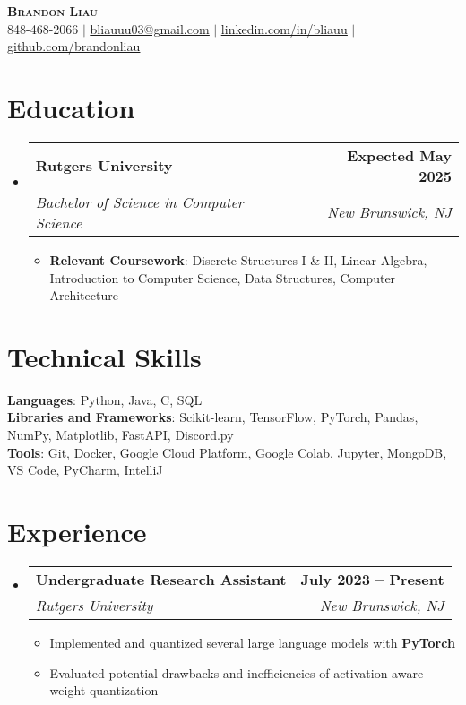 \documentclass[letterpaper,11pt]{article}
\makeatletter
\newcommand{\resumeItem}[1]{
  \item\small{
    {#1 \vspace{-2pt}}
  }
}
\newcommand{\resumeSubheading}[4]{
  \vspace{-2pt}\item
    \begin{tabular*}{0.97\textwidth}[t]{l@{\extracolsep{\fill}}r}
      \textbf{#1} & #2 \\
      \textit{\small#3} & \textit{\small #4} \\
    \end{tabular*}\vspace{-7pt}
}
\newcommand{\resumeSubHeadingListStart}{\begin{itemize}[leftmargin=0.15in, label={}]}
\newcommand{\resumeSubHeadingListEnd}{\end{itemize}}
\newcommand{\resumeItemListStart}{\begin{itemize}}
\newcommand{\resumeItemListEnd}{\end{itemize}\vspace{-3pt}}
\makeatother
\begin{document}
\begin{center}
    \textbf{\Huge \scshape Brandon Liau} \\ \vspace{8pt}
    \small {} 848-468-2066 $|$ 
    \href{mailto:x@x.com}{ \underline{bliauuu03@gmail.com}} $|$ 
    \href{https://linkedin.com/in/bliauu}{ \underline{linkedin.com/in/bliauu}} $|$
    \href{https://github.com/brandonliau}{ \underline{github.com/brandonliau}}
\end{center}


\section{Education}
  \resumeSubHeadingListStart
    \resumeSubheading
      {Rutgers University}{\textbf{Expected May 2025}}
      {Bachelor of Science in Computer Science}{New Brunswick, NJ}
      \resumeItemListStart
        \resumeItem{\textbf{Relevant Coursework}: Discrete Structures I \& II, Linear Algebra, Introduction to Computer Science, Data Structures, Computer Architecture}
      \resumeItemListEnd
  \resumeSubHeadingListEnd


\section{Technical Skills}
 \begin{itemize}[leftmargin=0.15in, label={}]
    \small{\item{
     \textbf{Languages}{: Python, Java, C, SQL} \vspace{1.5pt}\\
     \textbf{Libraries and Frameworks}{: Scikit-learn, TensorFlow, PyTorch, Pandas, NumPy, Matplotlib, FastAPI, Discord.py} \vspace{1.5pt}\\
     \textbf{Tools}{: Git, Docker, Google Cloud Platform, Google Colab, Jupyter, MongoDB, VS Code, PyCharm, IntelliJ} \\
    }}
 \end{itemize}


\section{Experience}
  \resumeSubHeadingListStart
    \resumeSubheading
      {Undergraduate Research Assistant}{\textbf{July 2023 -- Present}}
      {Rutgers University}{New Brunswick, NJ}
      \resumeItemListStart
        \resumeItem{Implemented and quantized several large language models with \textbf{PyTorch}}
        \resumeItem{Evaluated potential drawbacks and inefficiencies of activation-aware weight quantization}
      \resumeItemListEnd
  \resumeSubHeadingListEnd
\end{document}

